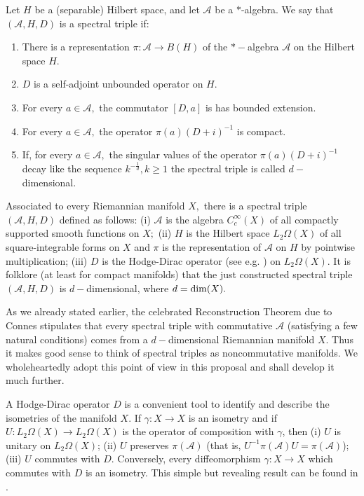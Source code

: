 \documentclass[12pt]{article}
\begin{document}
Let $H$ be a (separable) Hilbert space, and let $\mathcal{A}$ be a $*$-algebra. We say that $(\mathcal{A},H,D)$ is a spectral triple if:
\begin{enumerate}
\item There is a representation $\pi:\mathcal{A}\to B(H)$ of the $\ast-$algebra $\mathcal{A}$ on the Hilbert space $H.$
\item $D$ is a self-adjoint unbounded operator on $H.$
\item For every $a\in\mathcal{A},$ the commutator $[D,a]$ is has bounded extension.
\item For every $a\in\mathcal{A},$ the operator $\pi(a)(D+i)^{-1}$ is compact.
\item If, for every $a\in\mathcal{A},$ the singular values of the operator $\pi(a)(D+i)^{-1}$ decay like the sequence $k^{-\frac1d},k\geq 1$ the spectral triple is called $d-$dimensional.
\end{enumerate}

Associated to every Riemannian manifold $X,$ there is a spectral triple $(\mathcal{A},H,D)$ defined as follows: (i) $\mathcal{A}$ is the algebra $C^{\infty}_c(X)$ of all compactly supported smooth functions on $X;$ (ii) $H$ is the Hilbert space $L_2\Omega(X)$ of all square-integrable forms on $X$ and $\pi$ is the representation of $\mathcal{A}$ on $H$ by pointwise multiplication; (iii) $D$ is the Hodge-Dirac operator (see e.g. \cite{BGV}) on $L_2\Omega(X).$ It is folklore (at least for compact manifolds) that the just constructed spectral triple $(\mathcal{A},H,D)$ is $d-$dimensional, where $d={\rm dim}(X).$ 


As we already stated earlier, the celebrated Reconstruction Theorem due to Connes \cite{Connes-reconstruction} stipulates that every spectral triple with commutative $\mathcal{A}$ (satisfying a few natural conditions) comes from a $d-$dimensional Riemannian manifold $X.$ Thus it makes good sense to think of spectral triples as noncommutative manifolds. We wholeheartedly adopt this point of view in this proposal and shall develop it much further.

A Hodge-Dirac operator $D$ is a convenient tool to identify and describe the isometries of the manifold $X.$ If $\gamma:X\to X$ is an isometry and if $U:L_2\Omega(X)\to L_2\Omega(X)$ is the  operator of composition with $\gamma$, then (i) $U$ is unitary on $L_2\Omega(X)$; (ii) $U$ preserves $\pi(\mathcal{A})$ (that is, $U^{-1}\pi(\mathcal{A})U=\pi(\mathcal{A})$); (iii) $U$ commutes with $D.$ Conversely, every diffeomorphism $\gamma:X\to X$ which commutes with $D$ is an isometry. This simple but revealing result can be found in \cite{helgason}.
\end{document}
